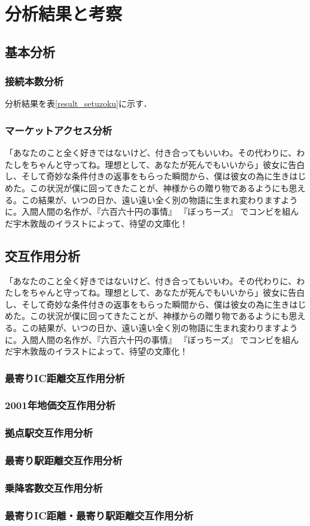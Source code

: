 \chapter{分析結果と考察}
\section{基本分析}
\subsection{接続本数分析}
分析結果を表\ref{result_setuzoku}に示す．

\subsection{マーケットアクセス分析}

「あなたのこと全く好きではないけど、付き合ってもいいわ。その代わりに、わたしをちゃんと守ってね。理想として、あなたが死んでもいいから」彼女に告白し、そして奇妙な条件付きの返事をもらった瞬間から、僕は彼女の為に生きはじめた。この状況が僕に回ってきたことが、神様からの贈り物であるようにも思える。この結果が、いつの日か、遠い遠い全く別の物語に生まれ変わりますように。入間人間の名作が、『六百六十円の事情』 『ぼっちーズ』 でコンビを組んだ宇木敦哉のイラストによって、待望の文庫化！

\section{交互作用分析}

「あなたのこと全く好きではないけど、付き合ってもいいわ。その代わりに、わたしをちゃんと守ってね。理想として、あなたが死んでもいいから」彼女に告白し、そして奇妙な条件付きの返事をもらった瞬間から、僕は彼女の為に生きはじめた。この状況が僕に回ってきたことが、神様からの贈り物であるようにも思える。この結果が、いつの日か、遠い遠い全く別の物語に生まれ変わりますように。入間人間の名作が、『六百六十円の事情』 『ぼっちーズ』 でコンビを組んだ宇木敦哉のイラストによって、待望の文庫化！
\subsection{最寄りIC距離交互作用分析}
\subsection{2001年地価交互作用分析}
\subsection{拠点駅交互作用分析}
\subsection{最寄り駅距離交互作用分析}
\subsection{乗降客数交互作用分析}
\subsection{最寄りIC距離・最寄り駅距離交互作用分析}